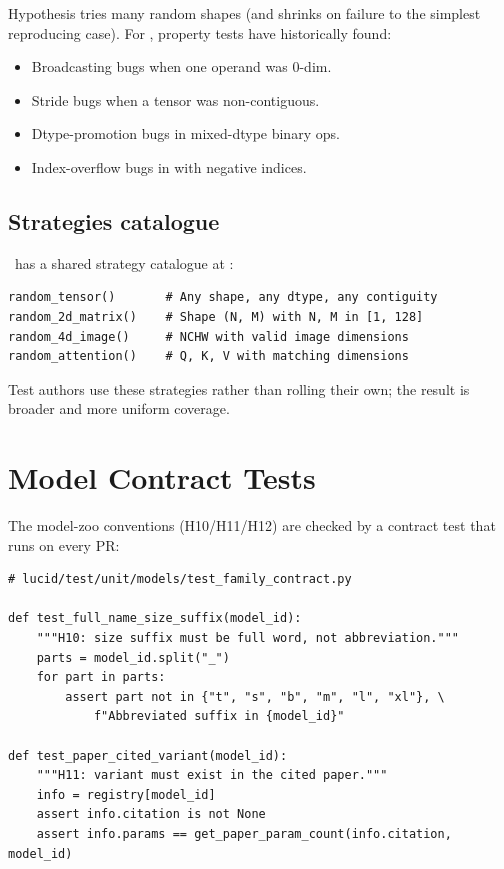 Hypothesis tries many random shapes (and shrinks on failure to
the simplest reproducing case). For \Lucid, property tests have
historically found:

\begin{itemize}
  \item Broadcasting bugs when one operand was 0-dim.
  \item Stride bugs when a tensor was non-contiguous.
  \item Dtype-promotion bugs in mixed-dtype binary ops.
  \item Index-overflow bugs in  with negative
    indices.
\end{itemize}

\subsection{Strategies catalogue}
\label{ssec:testing:strategies_catalogue}

\Lucid\ has a shared strategy catalogue at
:
\begin{lstlisting}[style=lucid,language=LucidPython]
random_tensor()       # Any shape, any dtype, any contiguity
random_2d_matrix()    # Shape (N, M) with N, M in [1, 128]
random_4d_image()     # NCHW with valid image dimensions
random_attention()    # Q, K, V with matching dimensions
\end{lstlisting}

Test authors use these strategies rather than rolling their
own; the result is broader and more uniform coverage.

\section{Model Contract Tests}
\label{sec:testing:model_contract}

The model-zoo conventions (H10/H11/H12) are checked by a
contract test that runs on every PR:

\begin{lstlisting}[style=lucid,language=LucidPython]
# lucid/test/unit/models/test_family_contract.py

def test_full_name_size_suffix(model_id):
    """H10: size suffix must be full word, not abbreviation."""
    parts = model_id.split("_")
    for part in parts:
        assert part not in {"t", "s", "b", "m", "l", "xl"}, \
            f"Abbreviated suffix in {model_id}"

def test_paper_cited_variant(model_id):
    """H11: variant must exist in the cited paper."""
    info = registry[model_id]
    assert info.citation is not None
    assert info.params == get_paper_param_count(info.citation, model_id)
\end{lstlisting}

